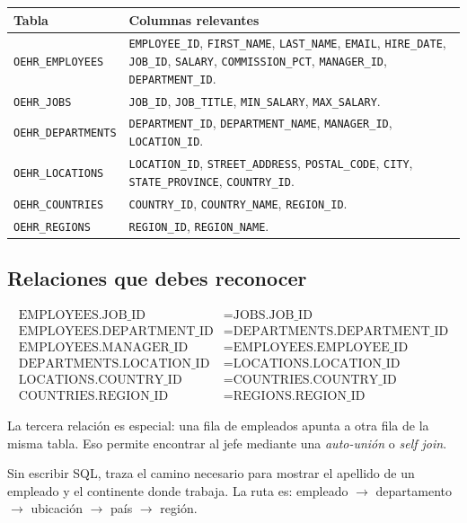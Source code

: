 \documentclass[11pt,a4paper]{article}
\newcommand{\campo}[1]{\texttt{#1}}
\newcommand{\tabla}[1]{\texttt{#1}}
\begin{document}
\begin{longtable}{p{} p{}}
\toprule
\textbf{Tabla} & \textbf{Columnas relevantes} \\
\midrule
\endhead
\tabla{OEHR\_EMPLOYEES} &
\campo{EMPLOYEE\_ID}, \campo{FIRST\_NAME}, \campo{LAST\_NAME}, \campo{EMAIL},
\campo{HIRE\_DATE}, \campo{JOB\_ID}, \campo{SALARY}, \campo{COMMISSION\_PCT},
\campo{MANAGER\_ID}, \campo{DEPARTMENT\_ID}. \\
\tabla{OEHR\_JOBS} &
\campo{JOB\_ID}, \campo{JOB\_TITLE}, \campo{MIN\_SALARY}, \campo{MAX\_SALARY}. \\
\tabla{OEHR\_DEPARTMENTS} &
\campo{DEPARTMENT\_ID}, \campo{DEPARTMENT\_NAME}, \campo{MANAGER\_ID},
\campo{LOCATION\_ID}. \\
\tabla{OEHR\_LOCATIONS} &
\campo{LOCATION\_ID}, \campo{STREET\_ADDRESS}, \campo{POSTAL\_CODE}, \campo{CITY},
\campo{STATE\_PROVINCE}, \campo{COUNTRY\_ID}. \\
\tabla{OEHR\_COUNTRIES} &
\campo{COUNTRY\_ID}, \campo{COUNTRY\_NAME}, \campo{REGION\_ID}. \\
\tabla{OEHR\_REGIONS} &
\campo{REGION\_ID}, \campo{REGION\_NAME}. \\
\bottomrule
\end{longtable}

\subsection{Relaciones que debes reconocer}

\begin{align*}
\text{EMPLOYEES.JOB\_ID} &= \text{JOBS.JOB\_ID} \\
\text{EMPLOYEES.DEPARTMENT\_ID} &= \text{DEPARTMENTS.DEPARTMENT\_ID} \\
\text{EMPLOYEES.MANAGER\_ID} &= \text{EMPLOYEES.EMPLOYEE\_ID} \\
\text{DEPARTMENTS.LOCATION\_ID} &= \text{LOCATIONS.LOCATION\_ID} \\
\text{LOCATIONS.COUNTRY\_ID} &= \text{COUNTRIES.COUNTRY\_ID} \\
\text{COUNTRIES.REGION\_ID} &= \text{REGIONS.REGION\_ID}
\end{align*}

La tercera relación es especial: una fila de empleados apunta a otra fila de la misma tabla. Eso
permite encontrar al jefe mediante una \emph{auto-unión} o \emph{self join}.

\begin{pausa}
Sin escribir SQL, traza el camino necesario para mostrar el apellido de un empleado y el continente
donde trabaja. La ruta es: empleado $\rightarrow$ departamento $\rightarrow$ ubicación
$\rightarrow$ país $\rightarrow$ región.
\end{pausa}
\end{document}
